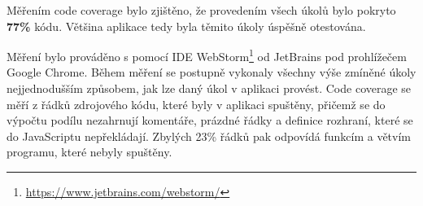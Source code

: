 Měřením code coverage bylo zjištěno, že provedením všech úkolů bylo pokryto \textbf{77\%} kódu. Většina aplikace tedy byla těmito úkoly úspěšně otestována.

Měření bylo prováděno s pomocí IDE WebStorm\footnote{\url{https://www.jetbrains.com/webstorm/}} od JetBrains pod prohlížečem Google Chrome. Během měření se postupně vykonaly všechny výše zmíněné úkoly nejjednodušším způsobem, jak lze daný úkol v aplikaci provést. Code coverage se měří z řádků zdrojového kódu, které byly v aplikaci spuštěny, přičemž se do výpočtu podílu nezahrnují komentáře, prázdné řádky a definice rozhraní, které se do JavaScriptu nepřekládají. Zbylých 23\% řádků pak odpovídá funkcím a větvím programu, které nebyly spuštěny.